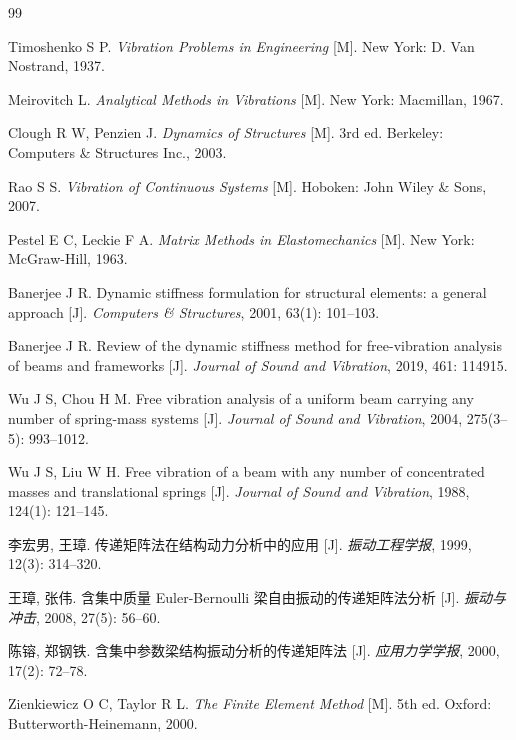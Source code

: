 \documentclass[twoside,12pt]{ctexart}
\begin{document}
\begin{thebibliography}{99}

Timoshenko S P. \textit{Vibration Problems in Engineering} [M].
New York: D. Van Nostrand, 1937.

Meirovitch L. \textit{Analytical Methods in Vibrations} [M].
New York: Macmillan, 1967.

Clough R W, Penzien J. \textit{Dynamics of Structures} [M].
3rd ed. Berkeley: Computers \& Structures Inc., 2003.

Rao S S. \textit{Vibration of Continuous Systems} [M].
Hoboken: John Wiley \& Sons, 2007.

Pestel E C, Leckie F A. \textit{Matrix Methods in Elastomechanics} [M].
New York: McGraw-Hill, 1963.

Banerjee J R. Dynamic stiffness formulation for structural elements: a general approach [J].
\textit{Computers \& Structures}, 2001, 63(1): 101--103.

Banerjee J R. Review of the dynamic stiffness method for free-vibration analysis
of beams and frameworks [J]. \textit{Journal of Sound and Vibration},
2019, 461: 114915.

Wu J S, Chou H M. Free vibration analysis of a uniform beam carrying any
number of spring-mass systems [J]. \textit{Journal of Sound and Vibration},
2004, 275(3--5): 993--1012.

Wu J S, Liu W H. Free vibration of a beam with any number of concentrated
masses and translational springs [J]. \textit{Journal of Sound and Vibration},
1988, 124(1): 121--145.

李宏男, 王璋. 传递矩阵法在结构动力分析中的应用 [J].
\textit{振动工程学报}, 1999, 12(3): 314--320.

王璋, 张伟. 含集中质量 Euler-Bernoulli 梁自由振动的传递矩阵法分析 [J].
\textit{振动与冲击}, 2008, 27(5): 56--60.

陈镕, 郑钢铁. 含集中参数梁结构振动分析的传递矩阵法 [J].
\textit{应用力学学报}, 2000, 17(2): 72--78.

Zienkiewicz O C, Taylor R L. \textit{The Finite Element Method} [M].
5th ed. Oxford: Butterworth-Heinemann, 2000.


\end{thebibliography}
\end{document}
